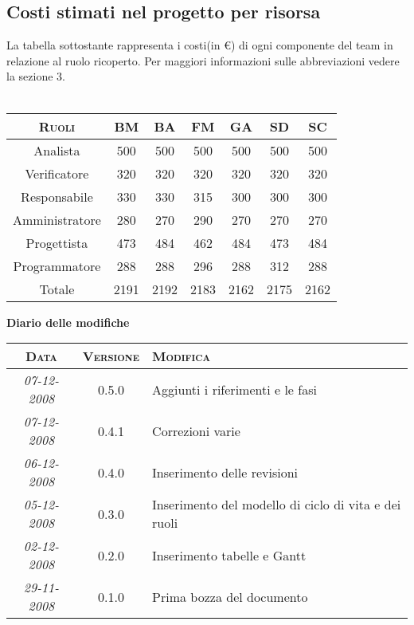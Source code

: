 \documentclass[11pt,a4paper]{article}
\newcommand{\modifiche} 
{
\newpage
\begin{center}
\textbf{Diario delle modifiche} \\
\bigskip
\begin{tabular}{|c|c|p{0.62\textwidth}|}
\hline
\textsc{Data} & \textsc{Versione} & \textsc{Modifica} \\
\hline
\hline
\textit{07-12-2008} & 0.5.0 & Aggiunti i riferimenti e le fasi \\
\hline
\textit{07-12-2008} & 0.4.1 & Correzioni varie \\
\hline
\textit{06-12-2008} & 0.4.0 & Inserimento delle revisioni \\
\hline
\textit{05-12-2008} & 0.3.0 & Inserimento del modello di ciclo di vita e dei ruoli \\
\hline
\textit{02-12-2008} & 0.2.0 & Inserimento tabelle e Gantt \\
\hline
\textit{29-11-2008} & 0.1.0 & Prima bozza del documento \\
\hline
\end{tabular}
\end{center}
}
\begin{document}
\subsection{Costi stimati nel progetto per risorsa}
La tabella sottostante rappresenta i costi(in \euro) di ogni componente del team in relazione al ruolo ricoperto.
Per maggiori informazioni sulle abbreviazioni vedere la sezione 3.\\\\
\begin{tabular}{|c|c|c|c|c|c|c|}
\hline
\textsc{Ruoli} & \textsc{BM} & \textsc{BA} & \textsc{FM} & \textsc{GA} & \textsc{SD} & \textsc{SC} \\ \hline \hline
Analista & 500 & 500 & 500 & 500 & 500 & 500 \\ \hline
Verificatore & 320 & 320 & 320 & 320 & 320 & 320 \\ \hline
Responsabile & 330 & 330 & 315 & 300 & 300 & 300 \\ \hline
Amministratore & 280 & 270 & 290 & 270 & 270 & 270 \\ \hline
Progettista & 473 & 484 & 462 & 484 & 473 & 484 \\ \hline
Programmatore & 288 & 288 & 296 & 288 & 312 & 288 \\ \hline
Totale & 2191 & 2192 & 2183 & 2162 & 2175 & 2162 \\ \hline
\end{tabular}
\modifiche
\end{document}
